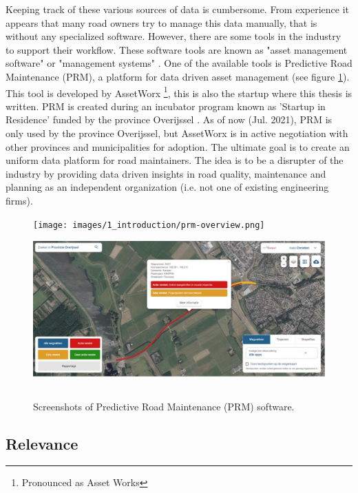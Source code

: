 Keeping track of these various sources of data is cumbersome. From experience it appears that  many road owners try to manage this data manually, that is without any specialized software. However, there are some tools in the industry to support their workflow. These software tools are known as "asset management software" or "management systems" . One of the available tools is Predictive Road Maintenance (PRM), a platform for data driven asset management (see figure \ref{fig:prm}). This tool is developed by AssetWorx \footnote{Pronounced as Asset Works}, this is also the startup where this thesis is written. PRM is created during an incubator program known as 'Startup in Residence' funded by the province Overijssel \cite{Residense2020}. As of now (Jul. 2021), PRM is only used by the province Overijssel, but AssetWorx is in active negotiation with other provinces and municipalities for adoption. The ultimate goal is to create an uniform data platform for road maintainers. The idea is to be a disrupter of the industry by providing data driven insights in road quality, maintenance and planning as an independent organization (i.e. not one of existing engineering firms). 

\begin{figure}[ht]
    \begin{center}
    \texttt{[image: images/1\_introduction/prm-overview.png]}
    \includegraphics[height=6cm]{images/1_introduction/prm-detail.png}
    \end{center}
    \caption{Screenshots of Predictive Road Maintenance (PRM) software.}
    \label{fig:prm}
\end{figure}


\subsection{Relevance}

